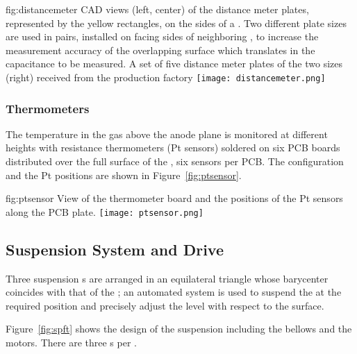 \begin{dunefigure}{fig:distancemeter}
{CAD views (left, center) of the distance meter plates, represented by the yellow rectangles, on the sides of a . Two different plate sizes are used in pairs, installed on facing sides of neighboring , %
to increase the measurement accuracy of the overlapping surface which translates in the capacitance to be measured. A set of five distance meter plates of the two sizes (right) received from the production factory}
\texttt{[image: distancemeter.png]}
\end{dunefigure}


\subsubsection{Thermometers}

The temperature in the gas above the anode plane is monitored at different heights with resistance thermometers (Pt sensors) soldered on  six PCB boards distributed over the full surface of the , six 
sensors per PCB. The configuration and the Pt positions are shown in Figure~\ref{fig:ptsensor}.

\begin{dunefigure}{fig:ptsensor}
{View of the thermometer board and the positions of the Pt sensors along the PCB plate.}
\texttt{[image: ptsensor.png]}
\end{dunefigure}

\subsection{Suspension System and Drive}
\label{sec:fddp-crp-suspension}

Three suspension \fdth{}s are arranged in an equilateral triangle whose barycenter coincides with that of the ; an automated system is used to suspend the  at the required position and precisely adjust the  level with respect to the \lar surface.

Figure~\ref{fig:spft} shows the design of the suspension \fdth including the bellows and the motors. There are three \fdth{}s per .

